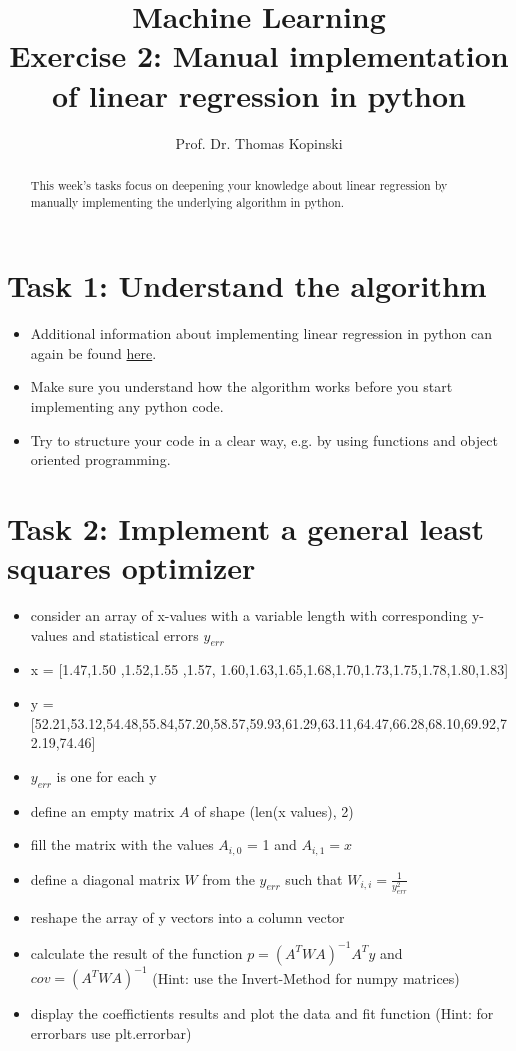 \documentclass{article}
\title{Machine Learning \\ Exercise 2: Manual implementation of linear regression in python}
\author{Prof. Dr. Thomas Kopinski}
\begin{document}
\maketitle

\begin{abstract}
This week's tasks focus on deepening your knowledge about linear regression by manually implementing the underlying algorithm in python. 
\end{abstract}

\section*{Task 1: Understand the algorithm}

\begin{itemize}
    \item Additional information about implementing linear regression in python can again be found \href{https://github.com/DataScienceLabFHSWF/machine-learning-book/blob/main/notebooks/ch09/ch09.ipynb}{here}.
    \item Make sure you understand how the algorithm works before you start implementing any python code.
    \item Try to structure your code in a clear way, e.g. by using functions and object oriented programming.
\end{itemize}
\section*{Task 2: Implement a general least squares optimizer}

\begin{itemize}
    \item consider an array of x-values with a variable length with corresponding y-values and statistical errors $y_{err}$
    \item x = [1.47,1.50 ,1.52,1.55 ,1.57, 1.60,1.63,1.65,1.68,1.70,1.73,1.75,1.78,1.80,1.83]
    \item y = [52.21,53.12,54.48,55.84,57.20,58.57,59.93,61.29,63.11,64.47,66.28,68.10,69.92,72.19,74.46]
    \item $y_{err}$ is one for each y
    \item define an empty matrix $A$ of shape (len(x values), 2)
    \item fill the matrix with the values $A_{i,0}$ = 1 and $A_{i,1}=x$
    \item define a diagonal matrix $W$ from the $y_{err}$ such that $W_{i,i} = \frac{1}{y_{err}^2} $
    \item reshape the array of y vectors into a column vector
    \item calculate the result of the function $p = (A^T W A)^{-1} A^T y$ and $cov = (A^T W A)^{-1}$ (Hint: use the Invert-Method for numpy matrices)
    \item display the coeffictients results and plot the data and fit function (Hint: for errorbars use plt.errorbar)
\end{itemize}
\end{document}
